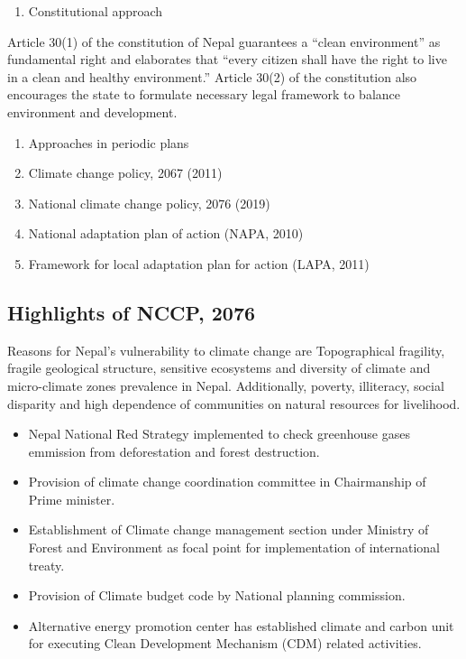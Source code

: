 \documentclass[
]{book}
\providecommand{\tightlist}{%
  \setlength{\itemsep}{0pt}\setlength{\parskip}{0pt}}
\begin{document}
\begin{enumerate}
\def\labelenumi{\arabic{enumi}.}
\tightlist
\item
  Constitutional approach
\end{enumerate}

Article 30(1) of the constitution of Nepal guarantees a ``clean environment'' as fundamental right and elaborates that ``every citizen shall have the right to live in a clean and healthy environment.'' Article 30(2) of the constitution also encourages the state to formulate necessary legal framework to balance environment and development.

\begin{enumerate}
\def\labelenumi{\arabic{enumi}.}
\setcounter{enumi}{1}
\tightlist
\item
  Approaches in periodic plans
\item
  Climate change policy, 2067 (2011)
\item
  National climate change policy, 2076 (2019)
\item
  National adaptation plan of action (NAPA, 2010)
\item
  Framework for local adaptation plan for action (LAPA, 2011)
\end{enumerate}

\hypertarget{highlights-of-nccp-2076}{%
\subsection{Highlights of NCCP, 2076}\label{highlights-of-nccp-2076}}

Reasons for Nepal's vulnerability to climate change are Topographical fragility, fragile geological structure, sensitive ecosystems and diversity of climate and micro-climate zones prevalence in Nepal. Additionally, poverty, illiteracy, social disparity and high dependence of communities on natural resources for livelihood.

\begin{itemize}
\tightlist
\item
  Nepal National Red Strategy implemented to check greenhouse gases emmission from deforestation and forest destruction.
\item
  Provision of climate change coordination committee in Chairmanship of Prime minister.
\item
  Establishment of Climate change management section under Ministry of Forest and Environment as focal point for implementation of international treaty.
\item
  Provision of Climate budget code by National planning commission.
\item
  Alternative energy promotion center has established climate and carbon unit for executing Clean Development Mechanism (CDM) related activities.
\end{itemize}
\end{document}
